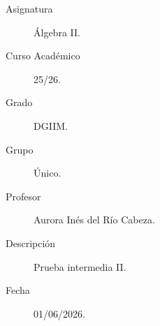 \documentclass[12pt]{article}
\begin{document}

    
    

    \begin{description}
        \item[Asignatura] Álgebra II.
        \item[Curso Académico] 25/26.
        \item[Grado] DGIIM.
        \item[Grupo] Único.
        \item[Profesor] Aurora Inés del Río Cabeza.
        \item[Descripción] Prueba intermedia II.
        \item[Fecha] 01/06/2026.
    \end{description}
    \newpage


    
\end{document}
